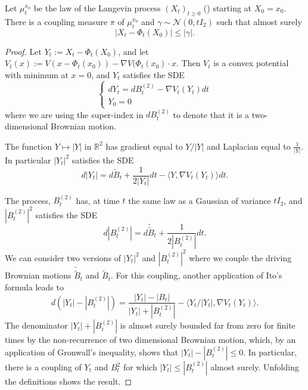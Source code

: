 \begin{lemma} \label{lem:coupling}
    Let \( \mu_t^{x_0} \) be the law of the Langevin process $(X_t)_{t \ge 0}$ () starting at $X_0 = x_0$. There is a coupling measure $\pi$ of \( \mu_t^{x_0} \) and \( \gamma \sim \mathcal N(0,tI_2) \) such that almost surely
    \[
        |X_t - \Phi_t(X_0)| \le |\gamma|.
    \]
\end{lemma}
\begin{proof}
    Let $Y_t:= X_t-\Phi_t(X_0)$, and let $V_t(x):= V(x-\Phi_t(x_0))-\nabla V(\Phi_{t}(x_0)\cdot x$. Then $V_t$ is a convex potential with minimum at $x=0$, and $Y_t$ satisfies the SDE
    $$
    \begin{cases}
        d Y_t = d B_t^{(2)} - \nabla V_t(Y_t) dt\\
        Y_0 = 0
    \end{cases}
    $$
    where we are using the super-index in $d B_t^{(2)}$ to denote that it is a two-dimensional Brownian motion. 
    
    The function $Y\mapsto |Y|$ in $\mathbb R^2$ has gradient equal to  $Y/|Y|$ and Laplacian equal to $\frac{1}{|Y|}$. In particular $|Y_t|^2$ satisfies the SDE
    $$
    d |Y_t| =  d \tilde B_t +\frac{1}{2|Y_t|} dt - \langle Y , \nabla V_t(Y_t)\rangle dt.
    $$
    
    The process, $B^{(2)}_t$ has, at time $t$ the same law as a Gaussian of variance $t I_2$, and $|B^{(2)}_t|^2$ satisfies the SDE
    $$
    d |B^{(2)}_t| = d \tilde {\tilde B}_t +\frac{1}{2|B^{(2)}_t|} dt.
    $$
    We can consider two versions of $|Y_t|^2$ and $|B^{(2)}_t|^2$ where we couple the driving Brownian motions $\tilde {\tilde B}_t$ and ${\tilde B}_t$. For this coupling, another application of Ito's formula leads to
    $$
    d (|Y_t| -|B^{(2)}_t|)  = \frac{|Y_t|-|B_t|}{|Y_t|+|B_t^{(2)}|} - \langle Y_t/|Y_t|,\nabla V_t(Y_t)\rangle.
    $$
    The denominator $|Y_t|+|B_t^{(2)}|$ is almost surely bounded far from zero for finite times by the non-recurrence of two dimensional Brownian motion, which, by an application of Gronwall's inequality, shows that $|Y_t| -|B^{(2)}_t| \le 0$. In particular, there is a coupling of $Y_t$ and $B_t^2$ for which $|Y_t| \le |B^{(2)}_t|$ almost surely. Unfolding the definitions shows the result.
    
\end{proof}


